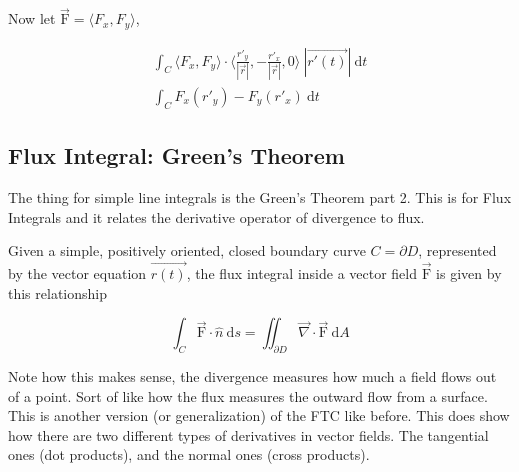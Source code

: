 Now let $\vec{\mathrm{F}} = \langle F_x,F_y\rangle$, 

\begin{align*}
	\int_C \langle F_x,F_y \rangle \cdot \langle \frac{r'_y}{|\vec{r}|},-\frac{r'_x}{|\vec{r}|},0\rangle \: |\vec{r'(t)}| \: \mathrm{d}t \\ 
	\int_C F_x(r'_y) - F_y(r'_x) \: \mathrm{d}t
\end{align*}


\subsection{Flux Integral: Green's Theorem}
The thing for simple line integrals is the Green's Theorem part 2. This is for Flux Integrals and it relates the derivative operator of divergence to flux.

{
	Given a simple, positively oriented, closed boundary curve $C=\partial D$, represented by the vector equation $\vec{r(t)}$, the flux integral inside a vector field $\vec{\mathrm{F}}$ is given by this relationship

	\begin{equation*}
		\int_C \vec{\mathrm{F}} \cdot \hat{n} \: \mathrm{d}s = \iint_{\partial D} \vec{\nabla} \cdot \vec{\mathrm{F}} \: \mathrm{d}A 
	\end{equation*}

	Note how this makes sense, the divergence measures how much a field flows out of a point. Sort of like how the flux measures the outward flow from a surface. This is another version (or generalization) of the FTC like before. This does show how there are two different types of derivatives in vector fields. The tangential ones (dot products), and the normal ones (cross products).
}


